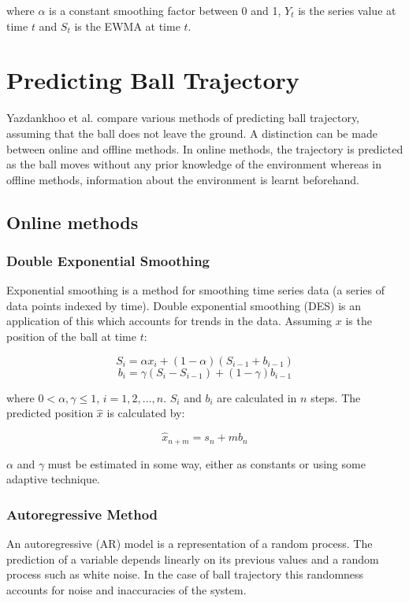 \noindent where $\alpha$ is a constant smoothing factor between 0 and 1, $Y_t$ is the series value at time $t$ and $S_t$ is the EWMA at time $t$.

\section{Predicting Ball Trajectory}
\label{section: trajectory lit review}

Yazdankhoo et al. \cite{Yazdankhoo2018} compare various methods of predicting ball trajectory, assuming that the ball does not leave the ground. A distinction can be made between online and offline methods. In online methods, the trajectory is predicted as the ball moves without any prior knowledge of the environment whereas in  offline methods, information about the environment is learnt beforehand. 

\subsection{Online methods}

\subsubsection{Double Exponential Smoothing}

Exponential smoothing is a method for smoothing time series data (a series of data points indexed by time). Double exponential smoothing (DES) is an application of this which accounts for trends in the data. Assuming $x$ is the position of the ball at time $t$:

\[ S_i = \alpha x_i + (1 - \alpha) (S_{i-1} + b_{i-1}) \]
\[ b_i = \gamma(S_i - S_{i-1}) + (1 - \gamma)b_{i-1} \]

\noindent where  $0 < \alpha, \gamma \leq 1$, $i = 1,2,...,n$. $S_i$ and $b_i$ are calculated in $n$ steps. The predicted position $\hat{x}$ is calculated by:

\[ \hat{x}_{n + m} = s_n + m b_n \]

$\alpha$ and $\gamma$ must be estimated in some way, either as constants or using some adaptive technique.

\subsubsection{Autoregressive Method}

An autoregressive (AR) model is a representation of a random process. The prediction of a variable depends linearly on its previous values and a random process such as white noise. In the case of ball trajectory this randomness accounts for noise and inaccuracies of the system. 

